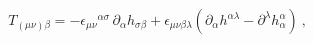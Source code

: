 \begin{equation}
\,T_{(\mu \nu )\beta }=-\epsilon _{\mu \nu }{}^{\alpha \sigma }\,\partial
_{\alpha }h_{\sigma \beta }+\epsilon _{\mu \nu \beta \lambda }\left(
\partial _{\alpha }h^{\alpha \lambda }-\partial ^{\lambda }h_{\alpha
}^{\alpha }\right) \ ,  \label{t2}
\end{equation}%
